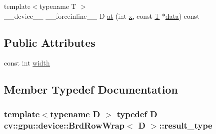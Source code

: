 \begin{DoxyCompactItemize}
\item 
{\footnotesize template$<$typename T $>$ }\\\-\_\-\-\_\-device\-\_\-\-\_\- \-\_\-\-\_\-forceinline\-\_\-\-\_\- D \hyperlink{structcv_1_1gpu_1_1device_1_1BrdRowWrap_adbf10b2c0522ac77c40f88c04dd975ed}{at} (int \hyperlink{highgui__c_8h_a6150e0515f7202e2fb518f7206ed97dc}{x}, const \hyperlink{calib3d_8hpp_a3efb9551a871ddd0463079a808916717}{T} $\ast$\hyperlink{legacy_8hpp_ab9fe6c09e6d02865a953fffc12fe6ca0}{data}) const 
\end{DoxyCompactItemize}
\subsection*{Public Attributes}
\begin{DoxyCompactItemize}
\item 
const int \hyperlink{structcv_1_1gpu_1_1device_1_1BrdRowWrap_a1a55bf1ce3b855b77939b514f805b02e}{width}
\end{DoxyCompactItemize}


\subsection{Member Typedef Documentation}
\hypertarget{structcv_1_1gpu_1_1device_1_1BrdRowWrap_a7e5536bc92be53562a1dd66281413b45}{
\subsubsection[{result\-\_\-type}]{\setlength{\rightskip}{0pt plus 5cm}template$<$typename D $>$ typedef D {\bf cv\-::gpu\-::device\-::\-Brd\-Row\-Wrap}$<$ D $>$\-::{\bf result\-\_\-type}}}\label{structcv_1_1gpu_1_1device_1_1BrdRowWrap_a7e5536bc92be53562a1dd66281413b45}


